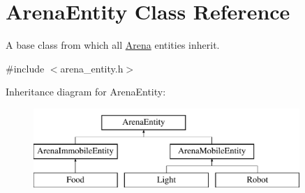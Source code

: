 \hypertarget{class_arena_entity}{}\section{Arena\+Entity Class Reference}
\label{class_arena_entity}


A base class from which all \mbox{\hyperlink{class_arena}{Arena}} entities inherit.  




{\ttfamily \#include $<$arena\+\_\+entity.\+h$>$}

Inheritance diagram for Arena\+Entity\+:\begin{figure}[H]
\begin{center}
\leavevmode
\includegraphics[height=3.000000cm]{class_arena_entity}
\end{center}
\end{figure}
